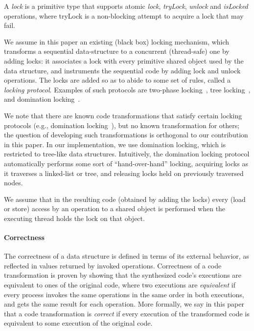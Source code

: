 A \emph{lock} is a primitive type that supports atomic \emph{lock},
\emph{tryLock}, \emph{unlock} and \emph{isLocked} operations, where tryLock is a
non-blocking attempt to acquire a lock that may fail.

We assume in this paper an existing (black box) locking mechanism, which transforms a sequential data-structure to a concurrent (thread-safe)
one by adding locks:
it associates a lock with every primitive shared object used by the data structure, and instruments the sequential code
by adding lock and unlock operations.
The locks are added so as to abide to some set of rules, called a \emph{locking protocol}.
Examples of such protocols are two-phase locking~\cite{Eswaran:1976}, tree locking~\cite{SilberschatzK1980}, and domination locking~\cite{Gueta2011}.

We note that there are known code transformations that satisfy certain locking protocols (e.g., domination locking~\cite{Gueta2011}), but no known
transformation for others; the question of developing such transformations is orthogonal to our contribution in this paper.
In our implementation, we use domination locking, which is restricted to tree-like data structures.
Intuitively, the domination locking protocol automatically performs some sort of ``hand-over-hand'' locking, acquiring locks as
it traverses a linked-list or tree, and releasing locks held on previously traversed nodes.

We assume that in the resulting code (obtained by adding the locks) every (load or store) access by an operation to a shared object is performed when the executing thread holds the lock on that object.


\paragraph{Correctness}

The correctness of a data structure is defined in terms of its external behavior, as reflected in values returned by invoked operations.
Correctness of a code transformation is proven by showing that the synthesized code's executions are equivalent to ones of the original code,
where two executions are  \emph{equivalent} if every process invokes the same operations in the same order  in both executions, and gets the
same result for each operation. More formally, we say in this paper that a code transformation is \emph{correct} if every execution of the transformed code
is equivalent to some execution of the original code.


